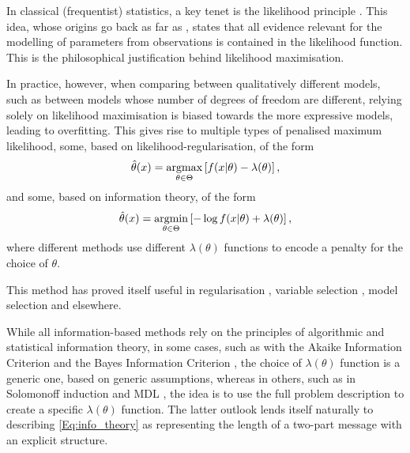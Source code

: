 \documentclass{IEEEtran}
\newcommand{\citet}[1]{\cite{#1}}
\newcommand{\citep}[1]{\cite{#1}}
\newcommand{\argmax}{\operatornamewithlimits{argmax}}
\newcommand{\argmin}{\operatornamewithlimits{argmin}}
\begin{document}
In classical (frequentist) statistics, a key tenet is the
likelihood principle \citep{birnbaum1962foundations}. This idea, whose
origins go back as far as \citet{fisher1922mathematical}, states that all
evidence relevant for the modelling of parameters from observations is
contained in the likelihood function. This is the philosophical justification
behind likelihood maximisation.

In practice, however, when comparing between qualitatively different models,
such as between models whose number of degrees of freedom are different,
relying solely on likelihood maximisation is biased towards the more expressive
models, leading to overfitting. This gives rise to multiple types of
penalised maximum likelihood, some, based on likelihood-regularisation,
of the form
\[
\hat{\theta}(x)=\argmax_{\theta\in\Theta} \left[f(x|\theta)-\lambda(\theta)\right],
\]
and some, based on information theory, of the form
\begin{equation}\label{Eq:info_theory}
\hat{\theta}(x)=\argmin_{\theta\in\Theta} \left[-\log f(x|\theta)+\lambda(\theta)\right],
\end{equation}
where different methods use different $\lambda(\theta)$ functions to encode
a penalty for the choice of $\theta$.

This method has proved itself useful in regularisation
\citep{tikhonov2013numerical,hoerl1970ridge}, variable selection
\citep{tibshirani1997lasso}, model selection
\citep{Akaike1973, schwarz1978estimating} and elsewhere.

While all information-based methods rely on
the principles of algorithmic and statistical information theory,
in some cases, such as with the Akaike Information Criterion \citep{Akaike1973}
and the Bayes Information Criterion \citep{schwarz1978estimating}, the choice of
$\lambda(\theta)$ function is a generic one, based on generic assumptions,
whereas in others, such as in Solomonoff induction \citep{solomonoff1964formal}
and MDL \citep{rissanen1989stochastic}, the idea is to use the full problem
description to create a specific $\lambda(\theta)$ function. The
latter outlook lends itself naturally to
describing \eqref{Eq:info_theory} as representing the length of a
two-part message with an explicit structure.
\end{document}

